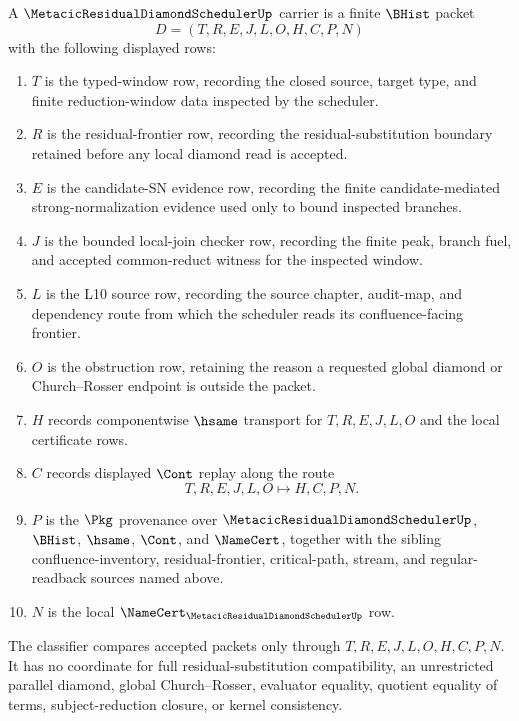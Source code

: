 \begin{definition}
\label{def:metacic-residual-diamond-scheduler-carrier}
A $\MetacicResidualDiamondSchedulerUp$ carrier is a finite $\BHist$ packet
$$
D=(T,R,E,J,L,O,H,C,P,N)
$$
with the following displayed rows:
\begin{enumerate}
\item $T$ is the typed-window row, recording the closed source, target type, and finite reduction-window data inspected by the scheduler.
\item $R$ is the residual-frontier row, recording the residual-substitution boundary retained before any local diamond read is accepted.
\item $E$ is the candidate-SN evidence row, recording the finite candidate-mediated strong-normalization evidence used only to bound inspected branches.
\item $J$ is the bounded local-join checker row, recording the finite peak, branch fuel, and accepted common-reduct witness for the inspected window.
\item $L$ is the L10 source row, recording the source chapter, audit-map, and dependency route from which the scheduler reads its confluence-facing frontier.
\item $O$ is the obstruction row, retaining the reason a requested global diamond or Church--Rosser endpoint is outside the packet.
\item $H$ records componentwise $\hsame$ transport for $T,R,E,J,L,O$ and the local certificate rows.
\item $C$ records displayed $\Cont$ replay along the route
$$
T,R,E,J,L,O \longmapsto H,C,P,N .
$$
\item $P$ is the $\Pkg$ provenance over $\MetacicResidualDiamondSchedulerUp$, $\BHist$, $\hsame$, $\Cont$, and $\NameCert$, together with the sibling confluence-inventory, residual-frontier, critical-path, stream, and regular-readback sources named above.
\item $N$ is the local $\NameCert_{\MetacicResidualDiamondSchedulerUp}$ row.
\end{enumerate}
The classifier compares accepted packets only through $T,R,E,J,L,O,H,C,P,N$. It has no coordinate for full residual-substitution compatibility, an unrestricted parallel diamond, global Church--Rosser, evaluator equality, quotient equality of terms, subject-reduction closure, or kernel consistency.
\end{definition}

